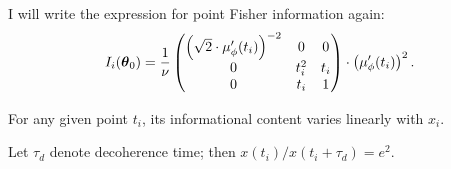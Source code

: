 \documentclass{article}
\begin{document}
I will write the expression for point Fisher information again:
\[
	\Fisher[i] = \frac{1}{\nu}\begin{pmatrix}
		\bkt{\sqrt{2}\cdot\mupp}^{-2} & 0     & 0   \\
		0                             & t_i^2 & t_i \\
		0                             & t_i   & 1
	\end{pmatrix}\cdot \bkt{\mupp}^2.
\]

For any given point $t_i$, its informational content varies linearly with $x_i$. 

Let $\tau_d$ denote decoherence time; then $x(t_i)/x(t_i + \tau_d) = e^2$.

\begin{figure}[h]
\end{figure}
\end{document}
